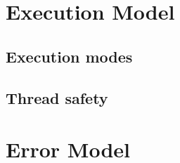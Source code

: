 \section{Execution Model}

\subsection{Execution modes}

\subsection{Thread safety}
\label{Sec:ThreadSafety}


\section{Error Model}
\label{Sec:ErrorModel}
